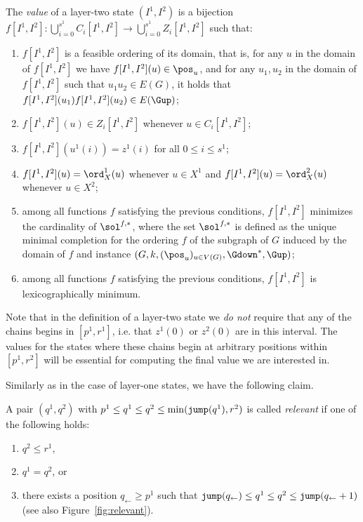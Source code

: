 \begin{definition}
The \emph{value} of a layer-two state $(I^1,I^2)$ is a bijection
$f[I^1,I^2]: \bigcup_{i=0}^{s^1} C_i[I^1,I^2] \to \bigcup_{i=0}^{s^1} Z_i[I^1,I^2]$
such that:
\begin{enumerate}
\item $f[I^1,I^2]$ is a feasible ordering of its domain, that is,
for any $u$ in the domain of $f[I^1,I^2]$ we have $f[I^1,I^2](u) \in \pos_u$, and
  for any $u_1,u_2$ in the domain of $f[I^1,I^2]$ such that $u_1u_2\in E(G)$, it holds that
  $f[I^1,I^2](u_1)f[I^1,I^2](u_2) \in E(\Gup)$;
\item $f[I^1,I^2](u) \in Z_i[I^1,I^2]$ whenever $u \in C_i[I^1,I^2]$;
\item $f[I^1,I^2](u^1(i)) = z^1(i)$ for all $0 \leq i \leq s^1$;
\item $f[I^1,I^2](u) = \ord_X^1(u)$ whenever $u \in X^1$ and $f[I^1,I^2](u) = \ord_X^2(u)$ whenever $u \in X^2$;\label{p:layer-two-last}
\item among all functions $f$ satisfying the previous conditions, $f[I^1,I^2]$ minimizes the cardinality
of $\sol^{f,\ast}$,
where the set $\sol^{f,\ast}$ is defined as the unique minimal completion for the ordering $f$ of the subgraph of $G$ induced by the domain of $f$
and \spic{} instance $(G,k,(\pos_u)_{u \in V(G)},\Gdown^\ast,\Gup)$;\label{p:layer-two-min}
\item among all functions $f$ satisfying the previous conditions, 
$f[I^1,I^2]$ is lexicographically minimum.
\end{enumerate}
\end{definition}

Note that in the definition of a layer-two state we {\em{do not}} require that any of the chains begins in $[p^1,r^1]$, i.e. that $z^1(0)$ or $z^2(0)$ are in this interval. The values for the states where these chains begin at arbitrary positions within $[p^1,r^2]$ will be essential for computing the final value we are interested in.

Similarly as in the case of layer-one states, we have the following claim.
\begin{definition}
A pair $(q^1,q^2)$ with $p^1 \leq q^1 \leq q^2 \leq \min(\mathtt{jump}(q^1),r^2)$ is called
\emph{relevant} if one of the following holds:
\begin{enumerate}
\item $q^2 \leq r^1$,
\item $q^1 = q^2$, or
\item there exists a position $q_{\leftarrow} \geq p^1$
such that $\mathtt{jump}(q_\leftarrow) \leq q^1 \leq q^2 \leq \mathtt{jump}(q_\leftarrow+1)$
(see also Figure~\ref{fig:relevant}).
\end{enumerate}
\end{definition}

